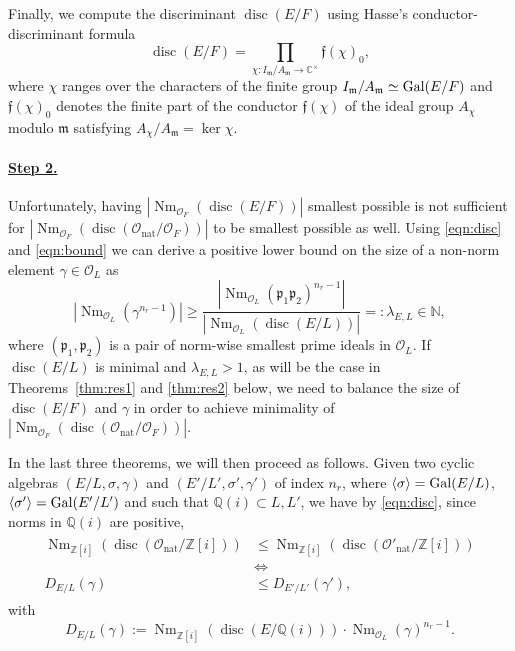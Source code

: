 \documentclass[smallextended]{svjour3}
\newcommand{\Q}{\mathbb{Q}}
\newcommand{\Z}{\mathbb{Z}}
\newcommand{\C}{\mathbb{C}}
\newcommand{\mcf}{\Or_{F}}
\newcommand{\mcl}{\Or_{L}}
\newcommand{\G}{{\rm Gal}}
\newcommand{\Or}{\mathcal{O}}
\DeclareMathOperator{\Nm}{Nm}
\DeclareMathOperator{\nat}{nat}
\DeclareMathOperator{\disc}{disc}
\begin{document}
Finally, we compute the discriminant $\disc(E/F)$ using Hasse's conductor-discriminant formula
\begin{equation}
\label{eqn:condisc}
	\disc(E/F)=\prod_{\chi:I_{\mathfrak m}/A_{\mathfrak m}\to\C^{\times}}\mathfrak f(\chi)_0,
\end{equation}
where $\chi$ ranges over the characters of the finite group $I_{\mathfrak m}/A_{\mathfrak m}\simeq \G(E/F)$ and $\mathfrak f(\chi)_0$ denotes the finite part of the conductor $\mathfrak f(\chi)$ of the ideal group $A_{\chi}$ modulo $\mathfrak m$ satisfying $A_{\chi}/A_{\mathfrak m}=\ker \chi$. 


\paragraph{\underline{Step 2.}}
Unfortunately, having $|\Nm_{\Or_F}(\disc(E/F))|$ smallest possible is not sufficient for $|\Nm_{\Or_F}(\disc(\Or_{\nat}/\mcf))|$ to be smallest possible as well. 
Using \eqref{eqn:disc} and \eqref{eqn:bound} we can derive a positive lower bound on the size of a non-norm element $\gamma \in \Or_L$ as  
\begin{equation}
\label{eqn:constant}
	\left|\Nm_{\Or_L}(\gamma ^{n_r-1})\right|\ge \frac{\left|\Nm_{\Or_L}(\mathfrak{p}_1\mathfrak{p}_2)^{n_r-1}\right|}{\left|\Nm_{\Or_L}(\disc(E/L))\right|} =: \lambda_{E,L} \in \mathbb{N},
\end{equation}
where $(\mathfrak{p}_1, \mathfrak{p}_2)$ is a pair of norm-wise smallest prime ideals in $\mcl$. 
If $\disc(E/L)$ is minimal and $\lambda_{E,L} > 1$, as will be the case in Theorems~\ref{thm:res1} and \ref{thm:res2} below, we need to balance the size of $\disc(E/F)$ and $\gamma$ in order to achieve minimality of $|\Nm_{\Or_F}(\disc(\Or_{\nat}/\mcf))|$. 

In the last three theorems, we will then proceed as follows. Given two cyclic algebras $(E/L, \sigma, \gamma)$ and $(E'/L',\sigma', \gamma')$ of index $n_r$, where $\langle \sigma \rangle = \G(E/L)$, $\langle \sigma' \rangle = \G(E'/L')$ and such that $\Q(i)\subset L, L'$, we have by \eqref{eqn:disc}, since norms in $\Q(i)$ are positive, 
\begin{align}
\label{eqn:discsize}
\begin{split}
	\Nm_{\Z[i]}(\disc(\Or_{\nat}/\Z[i])) &\le \Nm_{\Z[i]}(\disc(\Or'_{\nat}/\Z[i])) \\
	&\Leftrightarrow \\
	D_{E/L}(\gamma) &\le D_{E'/L'}(\gamma'),  
\end{split}
\end{align}
with  
\begin{equation}
\label{eqn:balance}
	D_{E/L}(\gamma) := \Nm_{\Z[i]}(\disc(E/\Q(i)))\cdot \Nm_{\Or_L}(\gamma)^{n_r-1}.
\end{equation} 
\end{document}
